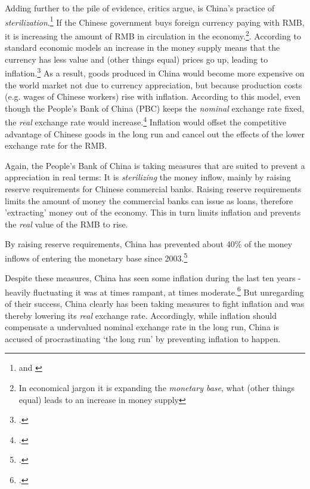 Adding further to the pile of evidence, critics argue, is China's 
practice of \emph{sterilization}.\footnote{\cite{Humpage2010} and \cite[p. ?]{Wang2011}} If the Chinese government buys foreign 
currency paying with RMB, it is increasing the amount of RMB in 
circulation in the economy.\footnote{In economical jargon it is 
expanding the \emph{monetary base}, what (other things equal) leads to 
an increase in money supply}. According to standard economic 
models an increase in the money 
supply means that the currency has less value and (other things equal) prices go up, leading 
to inflation.\footnote{\cite[pp. 432]{Krugman2008}.}
As a result, goods produced in China would become more expensive on the 
world market not due to currency appreciation, but because production 
costs (e.g. wages of Chinese workers) rise with inflation. According to 
this model, even though the People's Bank of China (PBC) keeps the 
\emph{nominal} exchange rate fixed, the \emph{real} exchange rate would 
increase.\footnote{\cite[p. 509]{Krugman2008}.} Inflation would offset the 
competitive advantage of Chinese goods in the long run and cancel out 
the effects of the lower exchange rate for the RMB.



Again, the People's Bank of China is taking measures that are suited to prevent a appreciation in real terms: It is \emph{sterilizing} the 
money inflow, mainly by raising reserve requirements for Chinese commercial banks. Raising reserve requirements limits the amount of money the commercial 
banks can issue as loans, therefore 'extracting' money out of the economy. This 
in turn limits inflation and prevents the \emph{real} value of the RMB to rise. 

By raising reserve requirements, China has prevented about 40\% of the money 
inflows of entering the monetary base since 2003.\footnote{\cite{Humpage2010}.}%

Despite these measures, China has seen some inflation during the last ten years - heavily fluctuating it was at times rampant, at times moderate.\footnote{\cite{Humpage2010}.} But unregarding of their success, China clearly has been taking measures to fight inflation and was thereby lowering its \emph{real} exchange rate. Accordingly, while inflation should compensate a undervalued nominal exchange rate in the long run, China is accused of procrastinating `the long run' by preventing inflation to happen.




